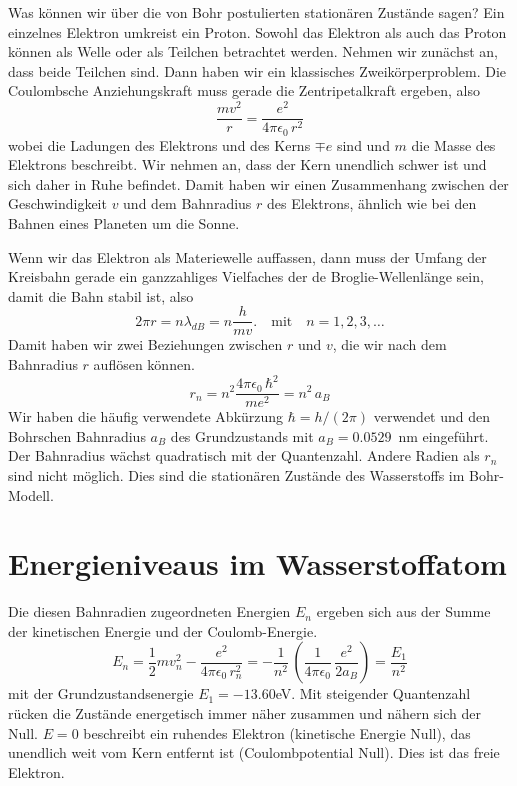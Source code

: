 Was können wir über die von Bohr postulierten stationären Zustände sagen? Ein einzelnes Elektron umkreist ein Proton. Sowohl das Elektron als auch das Proton können als Welle oder als Teilchen betrachtet werden. Nehmen wir zunächst an, dass beide Teilchen sind. Dann haben wir ein klassisches Zweikörperproblem. Die Coulombsche Anziehungskraft muss gerade die Zentripetalkraft ergeben, also
\begin{equation}
    \frac{m v^2}{r} = \frac{e^2}{4 \pi \epsilon_0 \, r^2}
\end{equation}
wobei die Ladungen des Elektrons und des Kerns $\mp e$ sind und $m$ die Masse des Elektrons beschreibt. Wir nehmen an, dass der Kern unendlich schwer ist und sich daher in Ruhe befindet. Damit haben wir einen Zusammenhang zwischen der Geschwindigkeit $v$ und dem Bahnradius $r$ des Elektrons, ähnlich wie bei den Bahnen eines Planeten um die Sonne.

Wenn wir das Elektron als Materiewelle auffassen, dann muss der Umfang der Kreisbahn gerade ein ganzzahliges Vielfaches der de Broglie-Wellenlänge sein, damit die Bahn stabil ist, also
\begin{equation}
    2 \pi r = n \lambda_{dB} = n \frac{h}{m v}. \quad \text{mit} \quad n = 1, 2, 3, \dots
\end{equation}
Damit haben wir zwei Beziehungen zwischen $r$ und $v$, die wir nach dem Bahnradius $r$ auflösen können.
\begin{equation}
    r_n = n^2 \frac{4 \pi \epsilon_0 \, \hbar^2}{m e^2} = n^2 \, a_B
\end{equation}
Wir haben die häufig verwendete Abkürzung $\hbar = h / (2\pi)$ verwendet und den Bohrschen Bahnradius $a_B$ des Grundzustands mit $a_B = 0.0529$~nm eingeführt. Der Bahnradius wächst quadratisch mit der Quantenzahl. Andere Radien als $r_n$ sind nicht möglich. Dies sind die stationären Zustände des Wasserstoffs im Bohr-Modell.

\section{Energieniveaus im Wasserstoffatom}

Die diesen Bahnradien zugeordneten Energien $E_n$ ergeben sich aus der Summe der kinetischen Energie und der Coulomb-Energie. 
\begin{equation}
    E_n = \frac{1}{2} m v_n^2 - \frac{e^2}{4 \pi \epsilon_0 \, r_n^2}
    = - \frac{1}{n^2} \, \left( \frac{1}{4 \pi \epsilon_0}  \, \frac{e^2}{2 a_B} \right) 
    =  \frac{E_1}{n^2}  
\end{equation}
mit der Grundzustandsenergie $E_1 = - 13.60$eV. Mit steigender Quantenzahl rücken die Zustände energetisch immer näher zusammen und nähern sich der Null. $E=0$ beschreibt ein ruhendes Elektron (kinetische Energie Null), das unendlich weit vom Kern entfernt ist (Coulombpotential Null). Dies ist das freie Elektron.


